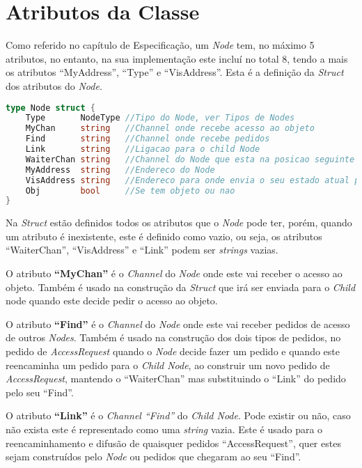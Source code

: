 \section{Atributos da Classe}
Como referido no capítulo de Especificação, um \emph{Node} tem, no máximo 5 atributos, no entanto, na sua implementação este incluí no total 8, tendo a mais os atributos ``MyAddress'', ``Type'' e ``VisAddress''.
Esta é a definição da \emph{Struct} dos atributos do \emph{Node}.



\begin{lstlisting}[caption={Definição da estrutura \emph{Node}},language=Go]
type Node struct {
	Type       NodeType //Tipo do Node, ver Tipos de Nodes
	MyChan     string   //Channel onde recebe acesso ao objeto
	Find       string   //Channel onde recebe pedidos
	Link       string   //Ligacao para o child Node
	WaiterChan string   //Channel do Node que esta na posicao seguinte da fila
	MyAddress  string   //Endereco do Node
	VisAddress string   //Endereco para onde envia o seu estado atual para a atualizacao da visualizacao
	Obj        bool     //Se tem objeto ou nao 
}

\end{lstlisting}
Na \emph{Struct} estão definidos todos os atributos que o \emph{Node} pode ter, porém, quando um atributo é inexistente, este é definido como vazio, ou seja, os atributos ``WaiterChan'', ``VisAddress'' e ``Link'' podem ser \emph{strings} vazias.

O atributo \textbf{``MyChan''} é o \emph{Channel} do \emph{Node} onde este vai receber o acesso ao objeto.
Também é usado na construção da \emph{Struct} que irá ser enviada para o \emph{Child} node quando este decide pedir o acesso ao objeto.

O atributo \textbf{``Find''} é o \emph{Channel} do \emph{Node} onde este vai receber pedidos de acesso de outros \emph{Nodes}. 
Também é usado na construção dos dois tipos de pedidos, no pedido de \emph{AccessRequest} quando o \emph{Node} decide fazer um pedido e quando este reencaminha um pedido para o \emph{Child Node}, ao construir um novo pedido de \emph{AccessRequest}, mantendo o ``WaiterChan'' mas substituindo o ``Link'' do pedido pelo seu ``Find''.

O atributo \textbf{``Link''} é o \emph{Channel ``Find''} do \emph{Child Node}. Pode existir ou não, caso não exista este é representado como uma \emph{string} vazia.
Este é usado para o reencaminhamento e difusão de quaisquer pedidos ``AccessRequest'', quer estes sejam construídos pelo \emph{Node} ou pedidos que chegaram ao seu ``Find''.

